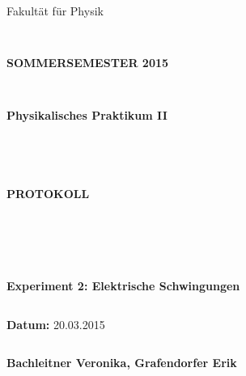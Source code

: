 \documentclass{article}
\begin{document}
\thispagestyle{empty}
			\begin{center}
			\Large{Fakultät für Physik}\\
			\end{center}
\begin{verbatim}


\end{verbatim}
			\begin{center}
			\textbf{\LARGE SOMMERSEMESTER 2015}
			\end{center}
\begin{verbatim}


\end{verbatim}
			\begin{center}
			\textbf{\LARGE{Physikalisches Praktikum II}}
			\end{center}
\begin{verbatim}




\end{verbatim}

			\begin{center}
			\textbf{\LARGE{PROTOKOLL}}
			\end{center}
			
\begin{verbatim}





\end{verbatim}

			\begin{flushleft}
			\textbf{\Large{Experiment 2: Elektrische Schwingungen}}\\
			\LARGE{}	
			\end{flushleft}

\begin{verbatim}

\end{verbatim}	
			\begin{flushleft}
			\textbf{\Large{Datum:}} \Large{20.03.2015}
			\end{flushleft}
			
\begin{verbatim}
\end{verbatim}
		\begin{flushleft}
			\textbf{\Large{Bachleitner Veronika, Grafendorfer Erik}} 
			\end{flushleft}
\end{document}
